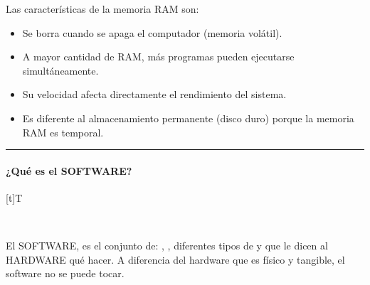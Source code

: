 \documentclass[letterpaper,10pt,spanish]{sphinxmanual}
\let\sphinxpxdimen\pdfpxdimen\else\newdimen\sphinxpxdimen
\begin{document}
\sphinxAtStartPar
Las características de la memoria RAM son:
\begin{itemize}
\item {} 
\sphinxAtStartPar
Se borra cuando se apaga el computador (memoria volátil).

\item {} 
\sphinxAtStartPar
A mayor cantidad de RAM, más programas pueden ejecutarse simultáneamente.

\item {} 
\sphinxAtStartPar
Su velocidad afecta directamente el rendimiento del sistema.

\item {} 
\sphinxAtStartPar
Es diferente al almacenamiento permanente (disco duro) porque la memoria RAM es temporal.

\end{itemize}


\bigskip\hrule\bigskip



\paragraph{¿Qué es el SOFTWARE?}
\label{\detokenize{cursos/logica8/recursos/T01:que-es-el-software}}

\begin{savenotes}\sphinxattablestart
\sphinxthistablewithglobalstyle
\centering
\begin{tabulary}{\linewidth}[t]{T}
\sphinxtoprule
\sphinxtableatstartofbodyhook

\begin{sphinxfigure-in-table}
\centering
\capstart
\noindent\sphinxincludegraphics[width=300\sphinxpxdimen]{{image031}.png}
\label{\detokenize{cursos/logica8/recursos/T01:id15}}\end{sphinxfigure-in-table}\relax
\\
\sphinxbottomrule
\end{tabulary}
\sphinxtableafterendhook\par
\sphinxattableend\end{savenotes}

\sphinxAtStartPar
\sphinxfootnotemark[1] El SOFTWARE, es el conjunto de: , , diferentes tipos de  y  que le dicen al HARDWARE qué hacer. A diferencia del hardware que es físico y tangible, el software no se puede tocar.
\end{document}
